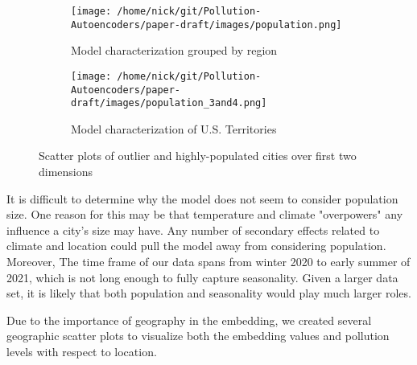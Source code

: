 \documentclass{article}
\begin{document}
\begin{figure}[h!]
\begin{subfigure}{0.5\textwidth}
    \texttt{[image: /home/nick/git/Pollution-Autoencoders/paper-draft/images/population.png]} 
    \caption{Model characterization grouped by region}
\end{subfigure}
\begin{subfigure}{0.5\textwidth}
    \texttt{[image: /home/nick/git/Pollution-Autoencoders/paper-draft/images/population\_3and4.png]}
    \caption{Model characterization of U.S. Territories}
\end{subfigure}
\caption{Scatter plots of outlier and highly-populated cities over first two dimensions}
\label{fig:population_comparison}
\end{figure}

\par It is difficult to determine why the model does not seem to consider population size. One reason for this may be that temperature and climate "overpowers" any influence a city's size may have. Any number of secondary effects related to climate and location could pull the model away from considering population. Moreover, The time frame of our data spans from winter 2020 to early summer of 2021, which is not long enough to fully capture seasonality. Given a larger data set, it is likely that both population and seasonality would play much larger roles.

\par Due to the importance of geography in the embedding, we created several geographic scatter plots to visualize both the embedding values and pollution levels with respect to location.
\end{document}
